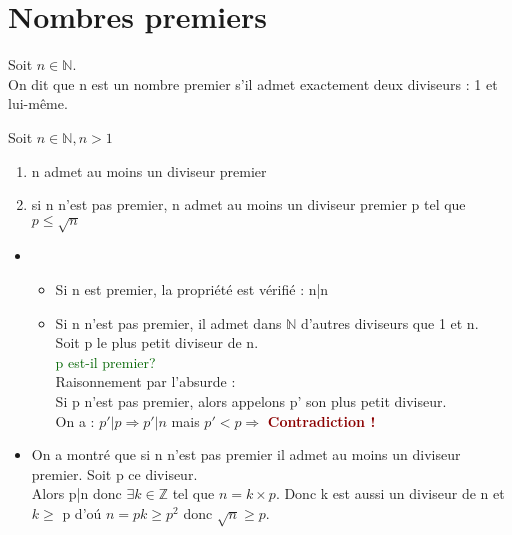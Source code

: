 \section{Nombres premiers}
\begin{madef}
Soit $n \in \mathbb{N}$. \\
On dit que n est un nombre premier s'il admet exactement deux diviseurs : 1 et lui-m\^eme.
\end{madef}

\begin{maprop}
Soit $n \in \mathbb{N} , n > 1$ 
\begin{enumerate}
	\item n admet au moins un diviseur premier
	\item si n n'est pas premier, n admet au moins un diviseur premier p tel que $p \le \sqrt{n}$ 
\end{enumerate}
\end{maprop}

\begin{myproof}[Demonstration:]
\begin{itemize}[label=, font=\color{black}]
	\item 
	\begin{itemize}[label=, font=\color{black}]
	\item Si n est premier, la propri\'et\'e est v\'erifi\'e : n|n
	\item Si n n'est pas premier, il admet dans $\mathbb{N}$ d'autres diviseurs que 1 et n. \\
	Soit p le plus petit diviseur de n. \\
	\textcolor{darkgreen}{p est-il premier?} \\
	Raisonnement par l'absurde : \\
	Si p n'est pas premier, alors appelons p' son plus petit diviseur.\\
	On a : $p'|p \Rightarrow p'|n $ mais $p'<p \Rightarrow $ \textbf{\textcolor{darkred}{Contradiction !}}  
	\end{itemize}
\end{itemize}
\begin{itemize}[label=, font=\color{black}]
	\item On a montr\'e que si n n'est pas premier il admet au moins un diviseur premier. Soit p ce diviseur. \\
	Alors p|n donc $\exists k \in \mathbb{Z}$ tel que $n=k \times p$. Donc k est aussi un diviseur de n et $k \ge$ p d'o\'u $n=pk \ge p^2$ donc $\sqrt{n} \ge p$.
\end{itemize}
\end{myproof}

